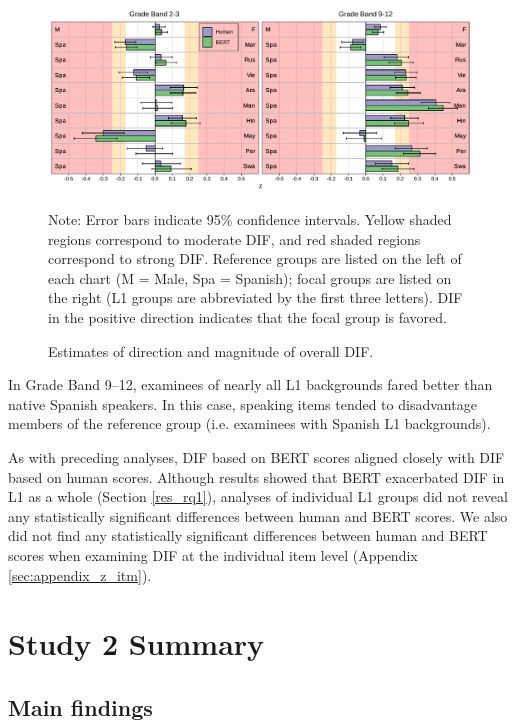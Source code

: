 \documentclass [PhD] {uclathes}
\begin{document}
\begin{figure}[t]
    \centering
    \caption{Estimates of direction and magnitude of overall DIF.}
\includegraphics[width=6.5in]{figures/20230504_ETS-DIF_BERT_z_ovr_edit.pdf}   
    \label{fig:z_ovr}
{\newline Note: Error bars indicate 95\% confidence intervals. Yellow shaded regions correspond to moderate DIF, and red shaded regions correspond to strong DIF. Reference groups are listed on the left of each chart (M = Male, Spa = Spanish); focal groups are listed on the right (L1 groups are abbreviated by the first three letters). DIF in the positive direction indicates that the focal group is favored. \par}
\end{figure}

In Grade Band 9–12, examinees of nearly all L1 backgrounds fared better than native Spanish speakers. In this case, speaking items tended to disadvantage members of the reference group (i.e. examinees with Spanish L1 backgrounds). 

As with preceding analyses, DIF based on BERT scores aligned closely with DIF based on human scores. Although results showed that BERT exacerbated DIF in L1 as a whole (Section \ref{res_rq1}), analyses of individual L1 groups did not reveal any statistically significant differences between human and BERT scores. We also did not find any statistically significant differences between human and BERT scores when examining DIF at the individual item level (Appendix \ref{sec:appendix_z_itm}). 

\section{Study 2 Summary}

\subsection{Main findings}
\end{document}
